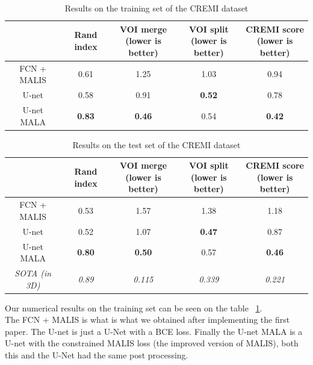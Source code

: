 \begin{table}[!htbp]
	\centering
	\begin{tabular}{|c|c|c|c|c|}
		\hline
		& Rand index & \thead{VOI merge \\(lower is better)} & \thead{VOI split\\(lower is better)} & \thead{CREMI score\\(lower is better)}\\
		\hline
		FCN + MALIS & 0.61 & 1.25 & 1.03 & 0.94\\
		\hline
		U-net & 0.58 & 0.91 & \textbf{0.52} & 0.78\\
		\hline
		U-net MALA & \textbf{0.83} & \textbf{0.46} & 0.54 & \textbf{0.42}\\
		\hline
	\end{tabular}
	\caption{Results on the training set of the CREMI dataset}
\label{tab:cremi_res_train}
\end{table}
\begin{table}[!htbp]
	\centering
	\begin{tabular}{|c|c|c|c|c|}
		\hline
		& Rand index & \thead{VOI merge \\(lower is better)} & \thead{VOI split\\(lower is better)} & \thead{CREMI score\\(lower is better)}\\
		\hline
		FCN + MALIS & 0.53 & 1.57 & 1.38 & 1.18\\
		\hline
		U-net & 0.52 & 1.07 & \textbf{0.47} & 0.87\\
		\hline
		U-net MALA & \textbf{0.80} & \textbf{0.50} & 0.57 & \textbf{0.46}\\
		\hline
		\hline
		\textit{SOTA (in 3D)} & \textit{0.89} & \textit{0.115} & \textit{0.339}& \textit{0.221}\\
		\hline
	\end{tabular}
	\caption{Results on the test set of the CREMI dataset}
\label{tab:cremi_res_test}
\end{table}

Our numerical results on the training set can be seen on the table ~\ref{tab:cremi_res_train}.\\
The FCN + MALIS is what is what we obtained after implementing the first paper.
The U-net is just a U-Net with a BCE loss.
Finally the U-net MALA is a U-net with the constrained MALIS loss (the improved
version of MALIS), both this and the U-Net had the same post processing.\\

